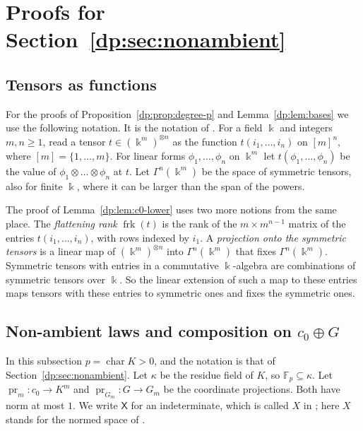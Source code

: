 \documentclass[11pt]{amsart}
\theoremstyle{definition}
\theoremstyle{remark}
\numberwithin{equation}{section}
\newcommand{\F}{\mathbb F}
\theoremstyle{plain}
\theoremstyle{definition}
\theoremstyle{plain}
\begin{document}
\section{Proofs for Section~\ref{dp:sec:nonambient}}\label{dp:app:proofs}

\subsection{Tensors as functions}\label{dp:ssec:tensor-notation}

For the proofs of Proposition~\ref{dp:prop:degree-p} and Lemma~\ref{dp:lem:bases} we use the following notation. It is the notation of \cite[Section~Q.5]{I}. For a field $\Bbbk$ and integers $m,n\ge1$, read a tensor $t\in(\Bbbk^m)^{\otimes n}$ as the function $t(i_1,\dots,i_n)$ on $[m]^n$, where $[m]=\{1,\dots,m\}$. For linear forms $\phi_1,\dots,\phi_n$ on $\Bbbk^m$ let $t(\phi_1,\dots,\phi_n)$ be the value of $\phi_1\otimes\dots\otimes\phi_n$ at $t$. Let $\Gamma^n(\Bbbk^m)$ be the space of symmetric tensors, also for finite $\Bbbk$, where it can be larger than the span of the powers.

The proof of Lemma~\ref{dp:lem:c0-lower} uses two more notions from the same place. The \emph{flattening rank} $\operatorname{frk}(t)$ is the rank of the $m\times m^{n-1}$ matrix of the entries $t(i_1,\dots,i_n)$, with rows indexed by $i_1$. A \emph{projection onto the symmetric tensors} is a linear map of $(\Bbbk^m)^{\otimes n}$ into $\Gamma^n(\Bbbk^m)$ that fixes $\Gamma^n(\Bbbk^m)$. Symmetric tensors with entries in a commutative $\Bbbk$\nobreakdash-algebra are combinations of symmetric tensors over $\Bbbk$. So the linear extension of such a map to these entries maps tensors with these entries to symmetric ones and fixes the symmetric ones.

\subsection{Non-ambient laws and composition on \texorpdfstring{$c_0\oplus G$}{c0+G}}\label{dp:af:c0}

In this subsection $p=\operatorname{char}K>0$, and the notation is that of Section~\ref{dp:sec:nonambient}. Let $\kappa$ be the residue field of $K$, so $\F_p\subseteq\kappa$. Let $\operatorname{pr}_m\colon c_0\to K^m$ and $\operatorname{pr}_{G_m}\colon G\to G_m$ be the coordinate projections. Both have norm at most $1$. We write $\mathsf X$ for an indeterminate, which is called $X$ in \cite[Appendix~K]{I}; here $X$ stands for the normed space of \cite[Definition~14.15]{I}.
\end{document}
